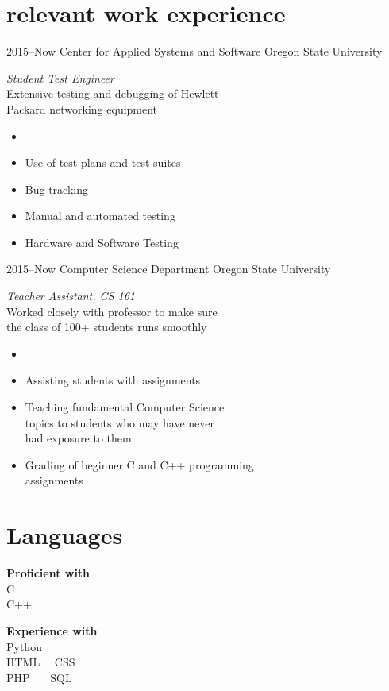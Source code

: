 \documentclass[print]{friggeri-cv} %
\begin{document}
\section{relevant work experience}


\begin{entrylist}


\entry 
{2015--Now}
{Center for Applied Systems and Software}
{Oregon State University}
{\emph{Student Test Engineer}\hfill \\
Extensive testing and debugging of Hewlett \\Packard networking equipment 
\begin{itemize}

\item[]\hfill 
\item Use of test plans and test suites
\item Bug tracking 
\item Manual and automated testing
\item Hardware and Software Testing
\end{itemize}} 


\entry
{2015--Now}
{Computer Science Department}
{Oregon State University}
{\emph{Teacher Assistant, CS 161}\\
Worked closely with professor to make sure \\ the class of 100+ students runs smoothly
\begin{itemize}
\item[]
\item Assisting students with assignments
\item Teaching fundamental Computer Science\\ topics to students who may have never \\ had exposure to them 
\item Grading of beginner C and C++ programming \\assignments
\end{itemize}}
\end{entrylist}


\section{Languages}
\begin{minipage}{0.4 \linewidth}
\textbf{Proficient with}\\
C \\ C++ \\ 
\end{minipage}
\begin{minipage}{0.4 \linewidth}
\textbf{Experience with}\\
Python\\ HTML \, \, CSS \\ PHP \, \, \, SQL
\end{minipage}
\end{document}
